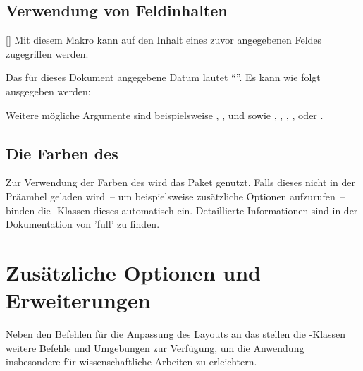 \begin{Declaration*}{}
\begin{Declaration*}{}
\begin{Declaration*}{}
\subsection{Verwendung von Feldinhalten}
%
\begin{Declaration}[v2.06]{[]}
\printdeclarationlist
Mit diesem Makro kann auf den Inhalt eines zuvor angegebenen Feldes zugegriffen 
werden.
\begin{Example}
Das für dieses Dokument angegebene Datum lautet \enquote{}. Es 
kann wie folgt ausgegeben werden:
\begin{Code}
\end{Code}
\end{Example}
Weitere mögliche Argumente sind beispielsweise , 
,  und  sowie ,
, , ,  oder
.
\end{Declaration}

\subsection{Die Farben des \CDs}
%
%
Zur Verwendung der Farben des \CDs wird das Paket  
genutzt. Falls dieses nicht in der Präambel geladen wird~-- um beispielsweise 
zusätzliche Optionen aufzurufen~-- binden die \TUDScript-Klassen dieses 
automatisch ein. Detaillierte Informationen sind in der Dokumentation von 
'full' zu finden.
%



\section{Zusätzliche Optionen und Erweiterungen}
%
Neben den Befehlen für die Anpassung des Layouts an das \TUDCD stellen die 
\TUDScript-Klassen weitere Befehle und Umgebungen zur Verfügung, um die 
Anwendung insbesondere für wissenschaftliche Arbeiten zu erleichtern.



\end{Declaration*}
\end{Declaration*}
\end{Declaration*}
